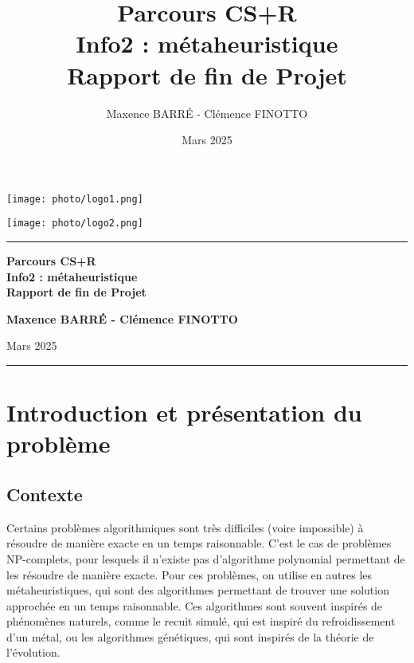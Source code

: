\documentclass[a4paper, 12pt]{article}
\title{\textbf{Parcours CS+R \\ Info2 : métaheuristique \\ Rapport de fin de Projet}}
\author{Maxence BARR\'E - Clémence FINOTTO}
\date{Mars 2025}
\begin{document}
\begin{titlepage}


\begin{center}
\begin{multicols}{2}
    \texttt{[image: photo/logo1.png]} 

    \columnbreak
    
    \texttt{[image: photo/logo2.png]} 
\end{multicols}    
    
\end{center}
\vspace{4cm}

\begin{center}
    \rule{15cm}{0.5pt}
    
    
        \vspace*{1cm} %

        \Huge \textbf{Parcours CS+R \\ Info2 : métaheuristique \\ Rapport de fin de Projet}

        \vspace{1cm} %

        \Large \textbf{Maxence BARR\'E - Clémence FINOTTO}

        \Large Mars 2025
  
    \rule{15cm}{0.5pt}

    
    
\end{center}

\restoregeometry
\end{titlepage}

\newpage
\tableofcontents
\newpage

\section{Introduction et présentation du problème}
\subsection{Contexte}
Certains problèmes algorithmiques sont très difficiles (voire impossible) à résoudre de manière exacte en un temps raisonnable. 
C'est le cas de problèmes NP-complets, pour lesquels il n'existe pas d'algorithme polynomial permettant de les résoudre de manière exacte. 
Pour ces problèmes, on utilise en autres les métaheuristiques, qui sont des algorithmes permettant de trouver une solution approchée en un temps raisonnable.
Ces algorithmes sont souvent inspirés de phénomènes naturels, comme le recuit simulé, qui est inspiré du refroidissement d'un métal, ou les algorithmes génétiques, qui sont inspirés de la théorie de l'évolution.
\end{document}
